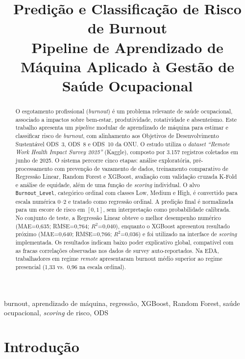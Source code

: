 \documentclass[conference]{IEEEtran}
\title{Predição e Classificação de Risco de Burnout\\{\large Pipeline de Aprendizado de Máquina Aplicado à Gestão de Saúde Ocupacional}}
\author{%
\IEEEauthorblockN{Breno Porto Pinheiro do Prado, RA 185196\\
Guilherme Bento Ramos, RA 185226}
\IEEEauthorblockA{\instituicao\\
\cidade\\
2026}
}
\begin{document}
\raggedbottom

\maketitle

\begin{abstract}
O esgotamento profissional (\textit{burnout}) é um problema relevante de
saúde ocupacional, associado a impactos sobre bem-estar, produtividade,
rotatividade e absenteísmo. Este trabalho apresenta um \textit{pipeline}
modular de aprendizado de máquina para estimar e classificar risco de
\textit{burnout}, com alinhamento aos Objetivos de Desenvolvimento
Sustentável ODS~3, ODS~8 e ODS~10 da ONU. O estudo utiliza o
\textit{dataset} \textit{``Remote Work Health Impact Survey 2025''}
(Kaggle), composto por 3.157 registros coletados em junho de 2025. O
sistema percorre cinco etapas: análise exploratória, pré-processamento
com prevenção de vazamento de dados, treinamento comparativo de
Regressão Linear, Random Forest e XGBoost, avaliação com validação
cruzada K-Fold e análise de equidade, além de uma função de
\textit{scoring} individual. O alvo \texttt{Burnout_Level}, categórico
ordinal com classes Low, Medium e High, é convertido para escala
numérica 0--2 e tratado como regressão ordinal. A predição final é
normalizada para um escore de risco em $[0,1]$, sem interpretação como
probabilidade calibrada. No conjunto de teste, a Regressão Linear obteve
o melhor desempenho numérico (MAE=0,635; RMSE=0,764; $R^2$=0,040),
enquanto o XGBoost apresentou resultado próximo (MAE=0,640; RMSE=0,766;
$R^2$=0,036) e foi utilizado na interface de \textit{scoring} implementada.
Os resultados indicam baixo poder explicativo global, compatível com as
fracas correlações observadas nos dados de survey auto-reportados. Na
EDA, trabalhadores em regime \textit{remote} apresentaram burnout médio
superior ao regime presencial (1,33 vs.\ 0,96 na escala ordinal).
\end{abstract}

\begin{IEEEkeywords}
burnout, aprendizado de máquina, regressão, XGBoost, Random Forest, saúde ocupacional, \textit{scoring} de risco, ODS
\end{IEEEkeywords}

\section{Introdução}
\label{sec:intro}
\end{document}
